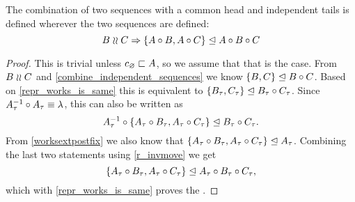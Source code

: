 \begin{mylem}
The combination of two sequences with a common head and independent tails 
is defined wherever the two sequences are defined:
\[ B\mathrel{\wr\wr} C \Rightarrow {\{{A\circ B, A\circ C}\}}\trianglelefteq{A\circ B\circ C} \]
\end{mylem}
\begin{proof}
This is trivial unless $c_\varnothing\sqsubset{A}$, so we assume that that is the case.
From $B\mathrel{\wr\wr} C$ and \cref{combine_independent_sequences} we know
${\{{B, C}\}}\trianglelefteq{B\circ C}$.
Based on \cref{repr_works_is_same} this is equivalent to
${\{{{B}_\tau, {C}_\tau}\}}\trianglelefteq{{B}_\tau\circ{C}_\tau}$.
Since ${A}_\tau^{-1}\circ {A}_\tau \equiv \lambda$, this can also be written as
\[{{A}_\tau^{-1}\circ\{{A}_\tau\circ {B}_\tau, {A}_\tau\circ {C}_\tau\}}\trianglelefteq{{B}_\tau\circ{C}_\tau}.\]
From \cref{worksextpostfix} we also know that
${\{{{A}_\tau\circ {B}_\tau, {A}_\tau\circ {C}_\tau}\}}\trianglelefteq{{A}_\tau}$.
Combining the last two statements using \cref{r_invmove}
we get
\[ {\{{{A}_\tau\circ {B}_\tau, {A}_\tau\circ {C}_\tau}\}}\trianglelefteq{{A}_\tau\circ{B}_\tau\circ{C}_\tau}, \]
which with \cref{repr_works_is_same} proves the
.
\end{proof}
